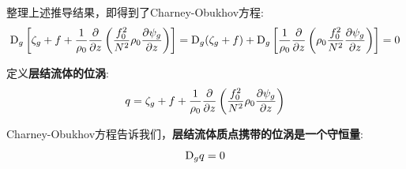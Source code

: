 \begin{proofbox}
    整理上述推导结果，即得到了Charney-Obukhov方程:
    \begin{equation*}
        \mathrm{D}_g \left[\relvort_g + \coriolis + \frac{1}{\density_0} \pde{}{z}\left(\frac{\coriolis_0^2}{\bvfreq^2} \density_0 \pde{\streamfunc_g}{z}\right)\right] = \mathrm{D}_g (\relvort_g + \coriolis) + \mathrm{D}_g \left[\frac{1}{\density_0} \pde{}{z}\left(\density_0 \frac{\coriolis_0^2}{\bvfreq^2} \pde{\streamfunc_g}{z}\right)\right] = 0
    \end{equation*}
\end{proofbox}

定义\textbf{层结流体的位涡}:
\begin{equation}
    \pv = \relvort_g + \coriolis + \frac{1}{\density_0} \pde{}{z}\left(\frac{\coriolis_0^2}{\bvfreq^2} \density_0 \pde{\streamfunc_g}{z}\right)
    \label{eq:def_qg_pv}
\end{equation}

Charney-Obukhov方程告诉我们，\textbf{层结流体质点携带的位涡是一个守恒量}:
\begin{equation}
    \mathrm{D}_g q = 0
    \label{eq:qg_pv_conservation}
\end{equation}
